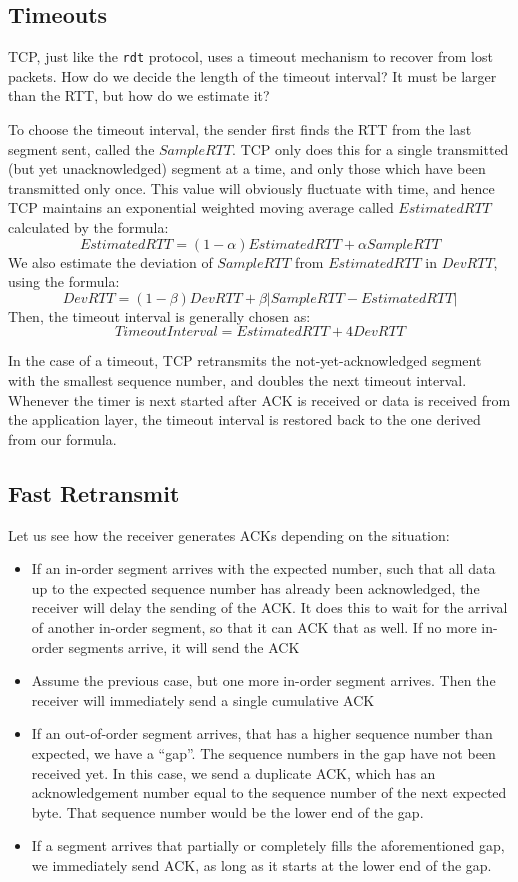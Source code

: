 \documentclass[12pt,letterpaper]{amsbook}
\theoremstyle{definition}
\begin{document}
\subsection{Timeouts}

TCP, just like the \texttt{rdt} protocol, uses a timeout mechanism to recover from lost packets. How do  we decide the length of the timeout interval? It must be larger than the RTT, but how do we estimate it?

To choose the timeout interval, the sender first finds the RTT from the last segment sent, called the $SampleRTT$. TCP only does this for a single transmitted (but yet unacknowledged) segment at a time, and only those which have been transmitted only once. This value will obviously fluctuate with time, and hence TCP maintains an exponential weighted moving average called $EstimatedRTT$ calculated by the formula:
\[EstimatedRTT = (1-\alpha) EstimatedRTT + \alpha SampleRTT\]
We also estimate the deviation of $SampleRTT$ from $EstimatedRTT$ in $DevRTT$, using the formula:
\[DevRTT = (1-\beta)DevRTT + \beta |SampleRTT - EstimatedRTT|\]
Then, the timeout interval is generally chosen as:
\[TimeoutInterval = EstimatedRTT + 4 DevRTT\]

In the case of a timeout, TCP retransmits the not-yet-acknowledged segment with the smallest sequence number, and doubles the next timeout interval. Whenever the timer is next started after ACK is received or data is received from the application layer, the timeout interval is restored back to the one derived from our formula.

\subsection{Fast Retransmit}

Let us see how the receiver generates ACKs depending on the situation:

\begin{itemize}
  \item If an in-order segment arrives with the expected number, such that all data up to the expected sequence number has already been acknowledged, the receiver will delay the sending of the ACK. It does this to wait for the arrival of another in-order segment, so that it can ACK that as well. If no more in-order segments arrive, it will send the ACK
  \item Assume the previous case, but one more in-order segment arrives. Then the receiver will immediately send a single cumulative ACK
  \item If an out-of-order segment arrives, that has a higher sequence number than expected, we have a ``gap''. The sequence numbers in the gap have not been received yet. In this case, we send a duplicate ACK, which has an acknowledgement number equal to the sequence number of the next expected byte. That sequence number would be the lower end of the gap.
  \item If a segment arrives that partially or completely fills the aforementioned gap, we immediately send ACK, as long as it starts at the lower end of the gap.
\end{itemize}
\end{document}
